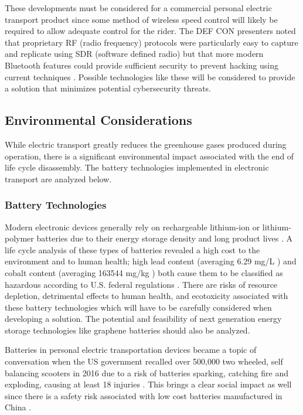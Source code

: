 These developments must be considered for a commercial personal electric transport product since some method of wireless speed control will likely be required to allow adequate control for the rider. The DEF CON presenters noted that proprietary RF (radio frequency) protocols were particularly easy to capture and replicate using SDR (software defined radio) \cite{Radio}\cite{DEFCON} but that more modern Bluetooth features could provide sufficient security to prevent hacking using current techniques \cite{DEFCON}. Possible technologies like these will be considered to provide a solution that minimizes potential cybersecurity threats.

\subsection{Environmental Considerations}
While electric transport greatly reduces the greenhouse gases produced during operation, there is a significant environmental impact associated with the end of life cycle disassembly. The battery technologies implemented in electronic transport are analyzed below.
\subsubsection{Battery Technologies}
Modern electronic devices generally rely on rechargeable lithium-ion or lithium-polymer batteries due to their energy storage density and long product lives \cite{BatteryRecharge}. A life cycle analysis of these types of batteries revealed a high cost to the environment and to human health; high lead content (averaging 6.29 mg/L \cite{BatteryRecharge}) and cobalt content (averaging 163544 mg/kg \cite{BatteryRecharge}) both cause them to be classified as hazardous according to U.S. federal regulations \cite{BatteryRecharge}. There are risks of  resource depletion, detrimental effects to human health, and ecotoxicity associated with these battery technologies \cite{BatteryRecharge} which will have to be carefully considered when developing a solution. The potential and feasibility of next generation energy storage technologies like graphene batteries \cite{Graphene} should also be analyzed.

Batteries in personal electric transportation devices became a topic of conversation when the US government recalled over 500,000 two wheeled, self balancing scooters in 2016 due to a risk of batteries sparking, catching fire and exploding, causing at least 18 injuries \cite{CBCArticle}. This brings a clear social impact as well since there is a safety risk associated with low cost batteries manufactured in China \cite{CBCArticle}.

